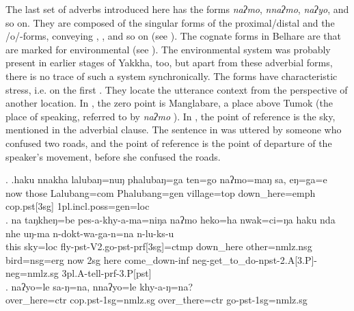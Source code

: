 The last set of adverbs introduced here has  the forms \emph{naʔmo}, \emph{nnaʔmo}, \emph{naʔyo}, and so on. They are composed of the singular forms of the proximal/distal  and the /o/-forms, conveying , ,  and so on (see ).  The cognate forms in Belhare are  that are marked for environmental  (see \citealt[226--27]{Bickel2001Deictic}). The environmental  system was probably present in earlier stages of Yakkha, too, but apart from these adverbial forms, there is no trace of such a system synchronically. The forms have characteristic stress, i.e. on the first . They locate the utterance context from the perspective of another location. In \Next[a], the zero point is Manglabare, a place above Tumok (the place of speaking, referred to by \emph{naʔmo} ). In \Next[b], the point of reference is the sky, mentioned in the adverbial clause.  The sentence in \Next[c] was uttered by someone who confused two roads, and the point of reference is the point of departure of the speaker's movement, before she confused the roads.

\ex. \ag.haku nnakha lalubaŋ=nuŋ   phalubaŋ=ga    ten=go         naʔmo=maŋ      sa,     eŋ=ga=e\\
now those Lalubang{\sc =com} Phalubang{\sc =gen} village{\sc =top} down\_here{\sc =emph} {\sc cop.pst[3sg]} {\sc 1pl.incl.poss=gen=loc}\\
 
\bg. na   taŋkheŋ=be    pes-a-khy-a-ma=niŋa naʔmo heko=ha nwak=ci=ŋa haku nda nhe uŋ-ma n-dokt-wa-ga-n=na n-lu-ks-u\\
	this sky{\sc =loc} fly{\sc -pst-V2.go-pst-prf[3sg]=ctmp} down\_here other{\sc =nmlz.nsg} bird{\sc =nsg=erg}	now {\sc 2sg} here come\_down{\sc -inf} {\sc neg-}get\_to\_do{\sc -npst-2.A[3.P]-neg=nmlz.sg} 	{\sc 3pl.A}-tell-{\sc prf-3.P[pst]}\\
	 
\bg.	naʔyo=le             sa-ŋ=na,                 nnaʔyo=le             khy-a-ŋ=na?\\
over\_here{\sc =ctr} {\sc cop.pst-1sg=nmlz.sg} over\_there{\sc =ctr} go{\sc -pst-1sg=nmlz.sg}\\
 

